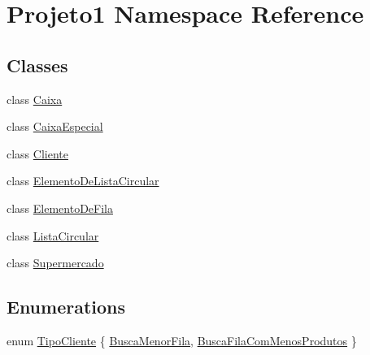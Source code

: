 \hypertarget{namespaceProjeto1}{
\section{Projeto1 Namespace Reference}
\label{namespaceProjeto1}
}
\subsection*{Classes}
\begin{DoxyCompactItemize}
\item 
class \hyperlink{classProjeto1_1_1Caixa}{Caixa}
\item 
class \hyperlink{classProjeto1_1_1CaixaEspecial}{CaixaEspecial}
\item 
class \hyperlink{classProjeto1_1_1Cliente}{Cliente}
\item 
class \hyperlink{classProjeto1_1_1ElementoDeListaCircular}{ElementoDeListaCircular}
\item 
class \hyperlink{classProjeto1_1_1ElementoDeFila}{ElementoDeFila}
\item 
class \hyperlink{classProjeto1_1_1ListaCircular}{ListaCircular}
\item 
class \hyperlink{classProjeto1_1_1Supermercado}{Supermercado}
\end{DoxyCompactItemize}
\subsection*{Enumerations}
\begin{DoxyCompactItemize}
\item 
enum \hyperlink{namespaceProjeto1_a4dade362b39c779d6411abf4ba19aeed}{TipoCliente} \{ \hyperlink{namespaceProjeto1_a4dade362b39c779d6411abf4ba19aeeda3c2a34a5670e3315f0c5493a00890611}{BuscaMenorFila}, 
\hyperlink{namespaceProjeto1_a4dade362b39c779d6411abf4ba19aeedaec1ed9ba7657b9ea20b55bada08f1825}{BuscaFilaComMenosProdutos}
 \}
\end{DoxyCompactItemize}


